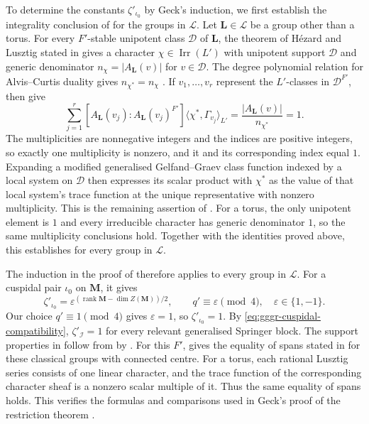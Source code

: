 \documentclass[10pt]{amsart}
\theoremstyle{definition}
\let\oldendproof\endproof
\renewenvironment{proof}[1][\proofname]{%
  \oldproof[\bfseries #1]%
}{\oldendproof}
\DeclareMathOperator{\Irr}{Irr}
\numberwithin{equation}{section}
\numberwithin{table}{section}
\begin{document}
\begin{proof}[Proof of Lemma~\ref{lem:type-b-isolated-coverage}]
To determine the constants $\zeta'_{\iota_0}$ by Geck's induction, we first
establish the integrality conclusion of \cite[Corollary~3.2]{Geck1999GGGR}
for the groups in $\mathscr L$.
Let $\mathbf L\in\mathscr L$ be a group other than a torus.
For every $F'$-stable unipotent class $\mathcal D$ of $\mathbf L$,
the theorem of H\'ezard and Lusztig stated in
\cite[Theorem~1.1]{Taylor2013} gives a character $\chi\in\Irr(L')$
with unipotent support $\mathcal D$ and generic denominator
$n_\chi=|A_{\mathbf L}(v)|$ for $v\in\mathcal D$.
The degree polynomial relation for Alvis--Curtis duality gives
$n_{\chi^*}=n_\chi$ \cite[Proposition~3.4.21]{GeckMalle2020}. If $v_1,\ldots,v_r$
represent the $L'$-classes in $\mathcal D^{F'}$, then \cite[(11.15), Lemma~14.15 and
Proposition~15.4]{Taylor2016} give
\begin{equation}\label{eq:gggr-weighted-integrality-sum}
 \sum_{j=1}^{r}
 [A_{\mathbf L}(v_j):A_{\mathbf L}(v_j)^{F'}]
 \langle\chi^*,\Gamma_{v_j}\rangle_{L'}
 =\frac{|A_{\mathbf L}(v)|}{n_{\chi^*}}=1.
\end{equation}
The multiplicities are nonnegative integers and the indices are positive
integers, so exactly one multiplicity is nonzero, and it and its corresponding
index equal $1$. Expanding a modified
generalised Gelfand--Graev class function indexed by a local system on
$\mathcal D$ then expresses its scalar product with $\chi^*$ as the value
of that local system's trace function at the unique representative with
nonzero multiplicity. This is the
remaining assertion of \cite[Proposition~3.1]{Geck1999GGGR}.
For a torus, the only unipotent element is $1$ and every irreducible
character has generic denominator $1$, so the same multiplicity conclusions hold.
Together with the identities proved above, this establishes
\cite[Corollary~3.2]{Geck1999GGGR} for every group in $\mathscr L$.

The induction in the proof of \cite[Theorem~3.8]{Geck1999GGGR} therefore applies
to every group in $\mathscr L$. For a cuspidal pair $\iota_0$ on $\mathbf M$,
it gives
\begin{equation}\label{eq:gggr-cuspidal-constant}
 \zeta'_{\iota_0}
 =\varepsilon^{(\operatorname{rank}\mathbf M-\dim Z(\mathbf M))/2},
 \qquad q'\equiv\varepsilon\pmod4,\quad \varepsilon\in\{1,-1\}.
\end{equation}
Our choice $q'\equiv1\pmod4$ gives $\varepsilon=1$, so $\zeta'_{\iota_0}=1$.
By \eqref{eq:gggr-cuspidal-compatibility}, $\zeta'_{\mathcal I}=1$ for every
relevant generalised Springer block. The support properties in \cite[(4.3)]{Geck1999GGGR}
follow from \cite[Theorem~10.7]{Lusztig1992Support} by
\cite[Corollary~13.6]{Taylor2016}. For this $F'$,
\cite[Theorem~3.2]{Shoji1995II} gives the equality of spans stated in
\cite[Theorem~7.1]{Geck1999GGGR} for these classical groups with connected centre.
For a torus, each rational Lusztig series consists of one linear character,
and the trace function of the corresponding character sheaf is a nonzero
scalar multiple of it. Thus the same equality of spans holds. This verifies the formulas and comparisons used in Geck's
proof of the restriction theorem \cite[Theorem~4.5]{Geck1999GGGR}.


\end{proof}
\end{document}
